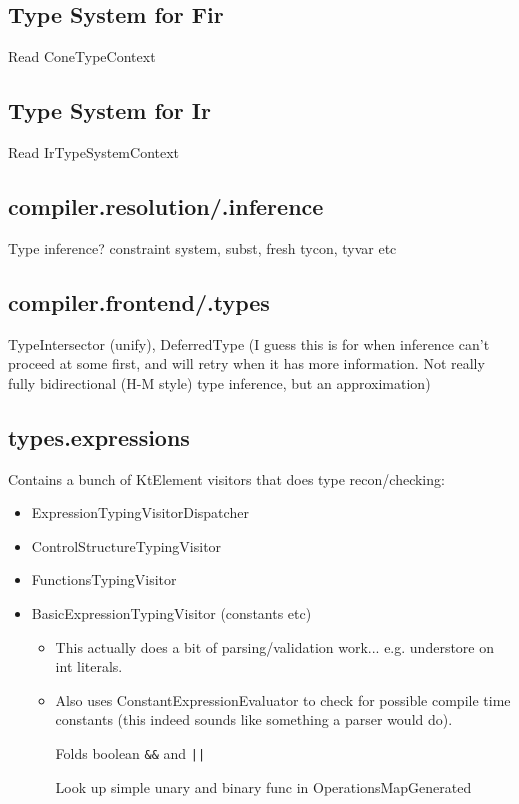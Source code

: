 \documentclass{article}
\begin{document}
\subsection{Type System for Fir}

Read ConeTypeContext

\subsection{Type System for Ir}

Read IrTypeSystemContext

\subsection{compiler.resolution/.inference}

Type inference? constraint system, subst, fresh tycon, tyvar etc

\subsection{compiler.frontend/.types}

TypeIntersector (unify), DeferredType (I guess this is for when inference can't proceed at some first, and will retry when it has more information. Not really fully bidirectional (H-M style) type inference, but an approximation)

\subsection{types.expressions}

Contains a bunch of KtElement visitors that does type recon/checking:
\begin{itemize}
\item ExpressionTypingVisitorDispatcher
\item ControlStructureTypingVisitor
\item FunctionsTypingVisitor
\item BasicExpressionTypingVisitor (constants etc)
\begin{itemize}
  \item This actually does a bit of parsing/validation work... e.g. understore on int literals.
  \item Also uses ConstantExpressionEvaluator to check for possible compile time constants (this indeed sounds like something a parser would do).
  
  Folds boolean \texttt{\&\&} and \texttt{||}

  Look up simple unary and binary func in OperationsMapGenerated
\end{itemize}
\end{itemize}
\end{document}
